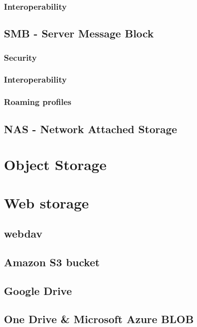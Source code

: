 \documentclass[a4paper,12pt,twoside,openright,titlepage]{book}
\begin{document}
\subsection{Interoperability}

\section{SMB - Server Message Block}

\subsection{Security}

\subsection{Interoperability}

\subsection{Roaming profiles}
\section{NAS - Network Attached Storage}


\chapter{Object Storage}


\chapter{Web storage}

\section{webdav}

\section{Amazon S3 bucket}
\section{Google Drive}
\section{One Drive \& Microsoft Azure BLOB}


\printindex
\end{document}
